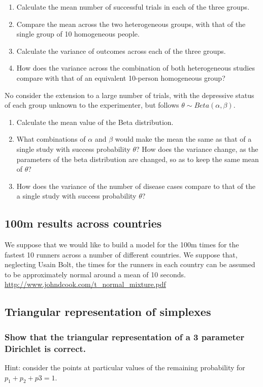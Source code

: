 \documentclass[11pt,fullpage]{book}
\begin{document}
\begin{enumerate}
\item Calculate the mean number of successful trials in each of the three groups.
\item Compare the mean across the two heterogeneous groups, with that of the single group of 10 homogeneous people.
\item Calculate the variance of outcomes across each of the three groups.
\item How does the variance across the combination of both heterogeneous studies compare with that of an equivalent 10-person homogeneous group?
\end{enumerate}

No consider the extension to a large number of trials, with the depressive status of each group unknown to the experimenter, but follows $\theta\sim Beta(\alpha,\beta)$.

\begin{enumerate}
\item Calculate the mean value of the Beta distribution.
\item What combinations of $\alpha$ and $\beta$ would make the mean the same as that of a single study with success probability $\theta$?
How does the variance change, as the parameters of the beta distribution are changed, so as to keep the same mean of $\theta$?
\item How does the variance of the number of disease cases compare to that of the a single study with success probability $\theta$?
\end{enumerate}

\subsection{100m results across countries}
We suppose that we would like to build a model for the 100m times for the fastest 10 runners across a number of different countries. We suppose that, neglecting Usain Bolt, the times for the runners in each country can be assumed to be approximately normal around a mean of 10 seconds. \url{http://www.johndcook.com/t_normal_mixture.pdf}

\subsection{Triangular representation of simplexes}
\subsubsection{Show that the triangular representation of a 3 parameter Dirichlet is correct.}
Hint: consider the points at particular values of the remaining probability for $p_1+p_2+p3=1$.
\end{document}
